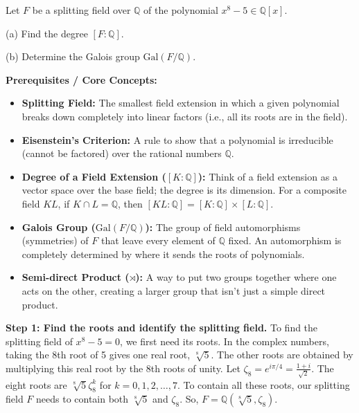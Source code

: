 \begin{exercise}
\label{algebra:2010:4}
Let $F$ be a splitting field over $\mathbb{Q}$ of the polynomial $x^8 - 5 \in \mathbb{Q}[x]$.

(a) Find the degree $[F : \mathbb{Q}]$.

(b) Determine the Galois group $\mathrm{Gal}(F/\mathbb{Q})$.
\end{exercise}

\begin{solution}
\textbf{Prerequisites / Core Concepts:}
\begin{itemize}
    \item \textbf{Splitting Field:} The smallest field extension in which a given polynomial breaks down completely into linear factors (i.e., all its roots are in the field).
    \item \textbf{Eisenstein's Criterion:} A rule to show that a polynomial is irreducible (cannot be factored) over the rational numbers $\mathbb{Q}$.
    \item \textbf{Degree of a Field Extension ($[K:\mathbb{Q}]$):} Think of a field extension as a vector space over the base field; the degree is its dimension. For a composite field $KL$, if $K \cap L = \mathbb{Q}$, then $[KL:\mathbb{Q}] = [K:\mathbb{Q}] \times [L:\mathbb{Q}]$.
    \item \textbf{Galois Group ($\mathrm{Gal}(F/\mathbb{Q})$):} The group of field automorphisms (symmetries) of $F$ that leave every element of $\mathbb{Q}$ fixed. An automorphism is completely determined by where it sends the roots of polynomials.
    \item \textbf{Semi-direct Product ($\rtimes$):} A way to put two groups together where one acts on the other, creating a larger group that isn't just a simple direct product.
\end{itemize}

\textbf{Step 1: Find the roots and identify the splitting field.}
To find the splitting field of $x^8 - 5 = 0$, we first need its roots.
In the complex numbers, taking the 8th root of 5 gives one real root, $\sqrt[8]{5}$. The other roots are obtained by multiplying this real root by the 8th roots of unity.
Let $\zeta_8 = e^{i\pi/4} = \frac{1+i}{\sqrt{2}}$. The eight roots are $\sqrt[8]{5} \zeta_8^k$ for $k = 0, 1, 2, \dots, 7$.
To contain all these roots, our splitting field $F$ needs to contain both $\sqrt[8]{5}$ and $\zeta_8$. So, $F = \mathbb{Q}(\sqrt[8]{5}, \zeta_8)$.


\end{solution}
